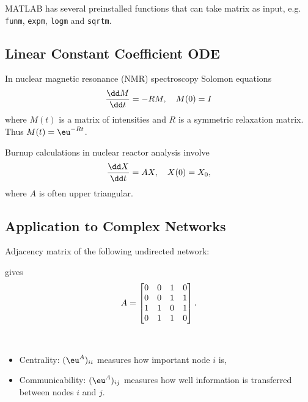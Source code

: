 \documentclass{article}
\begin{document}
MATLAB has several preinstalled functions that can take matrix as input,
e.g. \texttt{funm}, \texttt{expm}, \texttt{logm} and  \texttt{sqrtm}.

\subsection{Linear Constant Coefficient ODE}
In nuclear magnetic resonance (NMR) spectroscopy Solomon equations 
\begin{equation}\notag
    \frac{\dd M}{\dd t} = -RM, \quad M(0) = I
\end{equation}
where $M(t)$ is a matrix of intensities and $R$ is a symmetric
relaxation matrix. Thus $M(t) = \eu^{-Rt}$.

Burnup calculations in nuclear reactor analysis involve 
\begin{equation}\notag
    \frac{\dd X}{\dd t} = AX, \quad X(0) = X_0,
\end{equation}
where $A$ is often upper triangular.

\subsection{Application to Complex Networks}
Adjacency matrix of the following undirected network:

\begin{center}
\end{center}
gives 
\begin{equation}\notag
    A = 
    \begin{bmatrix}
        0 & 0 & 1 & 0 \\ 0 & 0 & 1 & 1 \\ 1 & 1 & 0 & 1 \\ 0 & 1 & 1 & 0
    \end{bmatrix}.
\end{equation}

\begin{definition}
    \

    \begin{itemize}
        \item Centrality: $(\eu^A)_{ii}$ measures how important node $i$
        is,
        \item Communicability: $(\eu^A)_{ij}$ measures how well
        information is transferred between nodes $i$ and $j$.
    \end{itemize}
\end{definition}
\end{document}
